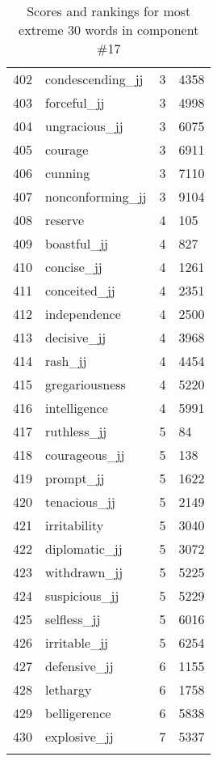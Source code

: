 \begin{longtable}[!htbp]{| rlr@{.}l |}
    402 & condescending\_jj & 3 & 4358 \\
    403 & forceful\_jj & 3 & 4998 \\
    404 & ungracious\_jj & 3 & 6075 \\
    405 & courage & 3 & 6911 \\
    406 & cunning & 3 & 7110 \\
    407 & nonconforming\_jj & 3 & 9104 \\
    408 & reserve & 4 & 105 \\
    409 & boastful\_jj & 4 & 827 \\
    410 & concise\_jj & 4 & 1261 \\
    411 & conceited\_jj & 4 & 2351 \\
    412 & independence & 4 & 2500 \\
    413 & decisive\_jj & 4 & 3968 \\
    414 & rash\_jj & 4 & 4454 \\
    415 & gregariousness & 4 & 5220 \\
    416 & intelligence & 4 & 5991 \\
    417 & ruthless\_jj & 5 & 84 \\
    418 & courageous\_jj & 5 & 138 \\
    419 & prompt\_jj & 5 & 1622 \\
    420 & tenacious\_jj & 5 & 2149 \\
    421 & irritability & 5 & 3040 \\
    422 & diplomatic\_jj & 5 & 3072 \\
    423 & withdrawn\_jj & 5 & 5225 \\
    424 & suspicious\_jj & 5 & 5229 \\
    425 & selfless\_jj & 5 & 6016 \\
    426 & irritable\_jj & 5 & 6254 \\
    427 & defensive\_jj & 6 & 1155 \\
    428 & lethargy & 6 & 1758 \\
    429 & belligerence & 6 & 5838 \\
    430 & explosive\_jj & 7 & 5337 \\
    \hline
    \caption{Scores and rankings for most extreme 30 words in component \#17} \\
\end{longtable}
